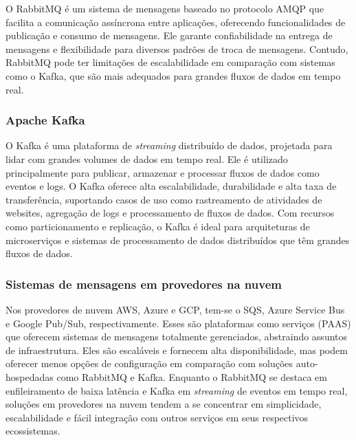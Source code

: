 O RabbitMQ é um sistema de mensagens baseado no protocolo AMQP que facilita a comunicação assíncrona entre aplicações, oferecendo funcionalidades de publicação e consumo de mensagens. Ele garante confiabilidade na entrega de mensagens e flexibilidade para diversos padrões de troca de mensagens. Contudo, RabbitMQ pode ter limitações de escalabilidade em comparação com sistemas como o Kafka, que são mais adequados para grandes fluxos de dados em tempo real.

\subsubsection*{Apache Kafka}
O Kafka é uma plataforma de \emph{streaming} distribuído de dados, projetada para lidar com grandes volumes de dados em tempo real. Ele é utilizado principalmente para publicar, armazenar e processar fluxos de dados como eventos e logs. O Kafka oferece alta escalabilidade, durabilidade e alta taxa de transferência, suportando casos de uso como rastreamento de atividades de websites, agregação de logs e processamento de fluxos de dados. Com recursos como particionamento e replicação, o Kafka é ideal para arquiteturas de microserviços e sistemas de processamento de dados distribuídos que têm grandes fluxos de dados. \cite{apache-kafka}

\subsubsection{Sistemas de mensagens em provedores na nuvem}

Nos provedores de nuvem AWS, Azure e GCP, tem-se o SQS, Azure Service Bus e Google Pub/Sub, respectivamente. Esses são plataformas como serviços (PAAS) que oferecem sistemas de mensagens totalmente gerenciados, abstraindo assuntos de infraestrutura. Eles são escaláveis e fornecem alta disponibilidade, mas podem oferecer menos opções de configuração em comparação com soluções auto-hospedadas como RabbitMQ e Kafka. Enquanto o RabbitMQ se destaca em enfileiramento de baixa latência e Kafka em \emph{streaming} de eventos em tempo real, soluções em provedores na nuvem tendem a se concentrar em simplicidade, escalabilidade e fácil integração com outros serviços em seus respectivos ecossistemas.


